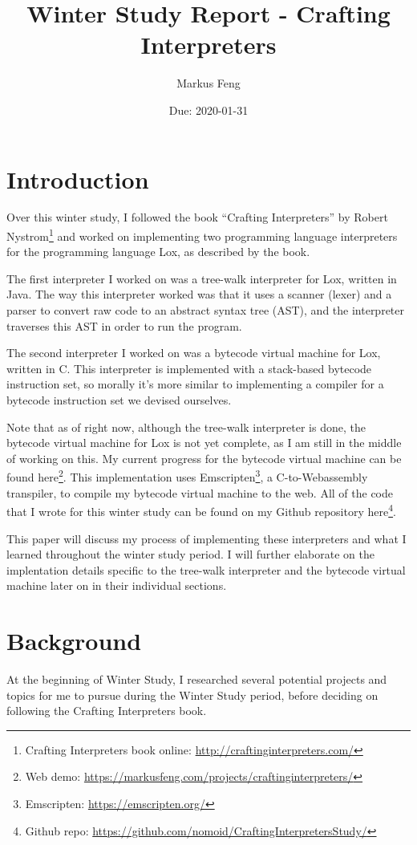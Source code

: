 \documentclass[tikz]{article}
\title{Winter Study Report - Crafting Interpreters}
\author{Markus Feng}
\date{Due: 2020-01-31}
\renewcommand{\:}{\colon}
\begin{document}
\maketitle

\section*{Introduction}

Over this winter study, I followed the book ``Crafting Interpreters'' by Robert Nystrom\footnote{Crafting Interpreters book online: \url{http://craftinginterpreters.com/}} and worked on implementing two programming language interpreters for the programming language Lox, as described by the book.

The first interpreter I worked on was a tree-walk interpreter for Lox, written in Java. The way this interpreter worked was that it uses a scanner (lexer) and a parser to convert raw code to an abstract syntax tree (AST), and the interpreter traverses this AST in order to run the program.

The second interpreter I worked on was a bytecode virtual machine for Lox, written in C. This interpreter is implemented with a stack-based bytecode instruction set, so morally it's more similar to implementing a compiler for a bytecode instruction set we devised ourselves. 

Note that as of right now, although the tree-walk interpreter is done, the bytecode virtual machine for Lox is not yet complete, as I am still in the middle of working on this. My current progress for the bytecode virtual machine can be found here\footnote{Web demo: \url{https://markusfeng.com/projects/craftinginterpreters/}}. This implementation uses Emscripten\footnote{Emscripten: \url{https://emscripten.org/}}, a C-to-Webassembly transpiler, to compile my bytecode virtual machine to the web. All of the code that I wrote for this winter study can be found on my Github repository here\footnote{Github repo: \url{https://github.com/nomoid/CraftingInterpretersStudy/}}.

This paper will discuss my process of implementing these interpreters and what I learned throughout the winter study period. I will further elaborate on the implentation details specific to the tree-walk interpreter and the bytecode virtual machine later on in their individual sections.

\section*{Background}
At the beginning of Winter Study, I researched several potential projects and topics for me to pursue during the Winter Study period, before deciding on following the Crafting Interpreters book.
\end{document}
